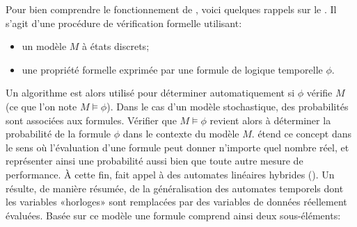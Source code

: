 Pour bien comprendre le fonctionnement de \lsah, voici quelques rappels sur le \modelchecking.
Il s'agit d'une procédure de vérification formelle utilisant:
\begin{itemize}
    \item un modèle $M$ à états discrets;
    \item une propriété formelle exprimée par une formule de logique temporelle $\phi$.
\end{itemize}
Un algorithme est alors utilisé pour déterminer automatiquement si $\phi$ vérifie $M$ (ce que l'on note $M\models\phi$).
Dans le cas d'un modèle stochastique, des probabilités sont associées aux formules.
Vérifier que $M\models\phi$ revient alors à déterminer la probabilité de la formule $\phi$ dans le contexte du modèle $M$\kern-1pt.
\lsah étend ce concept dans le sens où l'évaluation d'une formule peut donner n'importe quel nombre réel, et représenter ainsi une probabilité aussi bien que toute autre mesure de performance.
À cette fin, \lsah fait appel à des automates linéaires hybrides (\alh).
Un \alh résulte, de manière résumée, de la généralisation des automates temporels dont les variables «horloges» sont remplacées par des variables de données réellement évaluées.
Basée sur ce modèle une formule \lsah comprend ainsi deux sous-éléments:
